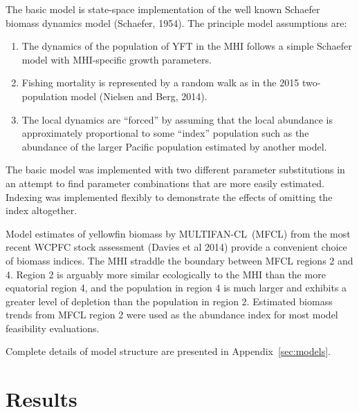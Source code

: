 \documentclass[12pt,letterpaper,twoside]{article}
\newcommand\MFCL{MULTIFAN-CL}
\begin{document}
The basic model is  state-space implementation of the well known
Schaefer biomass dynamics model (Schaefer, 1954).
The principle model assumptions are:
\begin{enumerate}
\item The dynamics of the population of YFT in the MHI follows a
simple Schaefer model with MHI-specific growth parameters.
\item Fishing mortality is represented by a random walk as in the
2015 two-population model (Nielsen and Berg, 2014).
\item The local dynamics are ``forced'' by assuming that the local
abundance is approximately proportional to some ``index'' population
such as the abundance of the larger Pacific population estimated by
another model.
\end{enumerate}

The basic model was implemented with two different parameter
substitutions in an attempt to find parameter combinations that are
more easily estimated. Indexing was implemented flexibly to
demonstrate the effects of omitting the index altogether.

Model estimates of yellowfin biomass by \MFCL\ (MFCL)
from the most recent WCPFC stock assessment (Davies et al 2014) provide
a convenient choice of biomass indices. The MHI straddle the
boundary between MFCL regions 2 and 4. Region 2 is arguably more similar
ecologically to the MHI than the more equatorial region 4, and the population
in region 4 is much larger and exhibits a greater level of depletion than the
population in region 2. Estimated biomass trends from MFCL region 2
were used as the abundance index for most model feasibility evaluations.

Complete details of model structure are presented in Appendix~\ref{sec:models}.



\section{Results}
\end{document}
